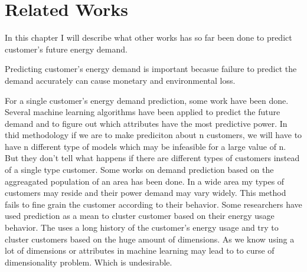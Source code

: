 
\chapter{Related Works}

In this chapter I will describe what other works has so far been done to predict customer's future energy demand.

Predicting customer's energy demand is important becasue failure to predict the demand accurately can cause monetary and environmental loss. 

For a single customer's energy demand prediction, some work  have been done. Several machine learning algorithms have been applied to predict the future demand and to figure out which attributes have the most predictive power. In thid methodology if we are to make prediciton about n customers, we will have to have n different type of models which may be infeasible for a large value of n. But they don't tell what happens if there are different types of customers instead of a single type customer. Some works on demand prediction based on the aggreagated population of an area has been done. In a wide area my types of customers may reside and their power demand may vary widely. This method fails to fine grain the customer according to their behavior. Some researchers have used prediction as a mean to cluster customer based on their energy usage behavior. The uses a long history of the customer's energy usage and try to cluster customers based on the huge amount of dimensions. As we know using a lot of dimensions or attributes in machine learning may lead to to curse of dimensionality problem. Which is undesirable.


